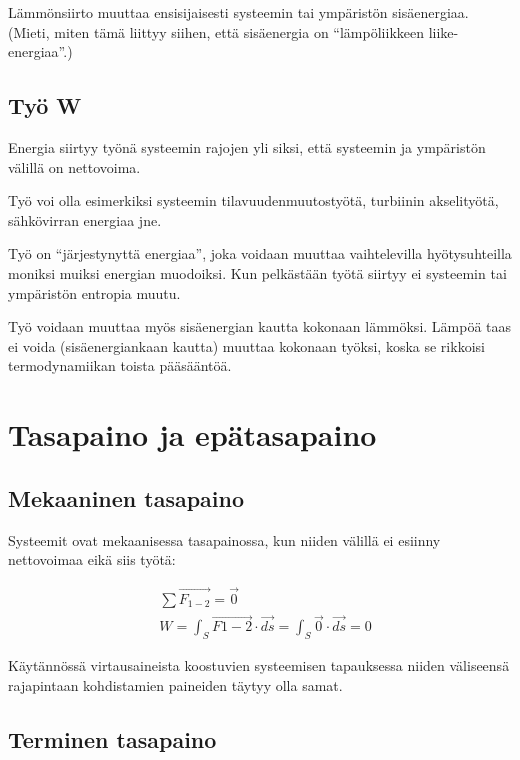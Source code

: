 \documentclass[12pt,a4paper,finnish]{book}
\begin{document}
Lämmönsiirto muuttaa ensisijaisesti systeemin tai ympäristön sisäenergiaa. (Mieti, 
miten tämä liittyy siihen, että sisäenergia on ``lämpöliikkeen liike-energiaa''.)

\section{Työ W} %

Energia siirtyy työnä systeemin rajojen yli siksi, että systeemin ja ympäristön 
välillä on nettovoima. 

Työ voi olla esimerkiksi systeemin tilavuudenmuutostyötä, turbiinin akselityötä, 
sähkövirran energiaa jne.

Työ on ``järjestynyttä energiaa'', joka voidaan muuttaa vaihtelevilla hyötysuhteilla 
moniksi muiksi energian muodoiksi. Kun pelkästään työtä siirtyy ei systeemin tai ympäristön 
entropia muutu.

Työ voidaan muuttaa myös sisäenergian kautta kokonaan lämmöksi. Lämpöä taas ei voida 
(sisäenergiankaan kautta) muuttaa kokonaan työksi, koska se rikkoisi termodynamiikan 
toista pääsääntöä.

\chapter{Tasapaino ja epätasapaino} %

\section{Mekaaninen tasapaino} %

Systeemit ovat mekaanisessa tasapainossa, kun niiden välillä ei esiinny nettovoimaa eikä 
siis työtä:

\begin{align}
 &\sum \vec{F_{1-2}} = \vec{0} \\
 &W = \int_S \vec{F{1-2}} \cdot \vec{ds} = \int_S \vec{0} \cdot \vec{ds} = 0
\end{align}

Käytännössä virtausaineista koostuvien systeemisen tapauksessa niiden väliseensä rajapintaan 
kohdistamien paineiden täytyy olla samat.

\section{Terminen tasapaino} %
\end{document}
